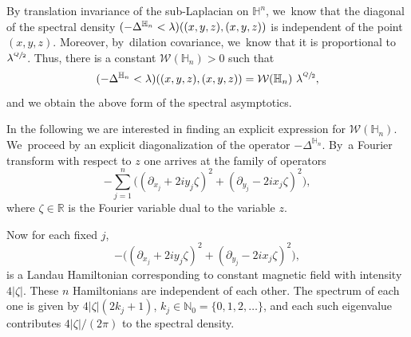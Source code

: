 \documentclass[11pt]{article}
\let\oldsfrac\sfrac
\renewcommand{\sfrac}[2]{{\oldsfrac{#1}{#2}}}
\theoremstyle{definition}
\newcommand{\1}{\mathbbm{1}}
\newcommand{\N}{\mathbb{N}}
\newcommand{\R}{\mathbb{R}}
\numberwithin{equation}{section}
\begin{document}
By translation invariance of the sub-Laplacian on $\mathbb H^n$, we~know that the diagonal of the spectral density $\1(-\Delta^{\mathbb H_n} <\lambda)((x,y,z),(x,y,z))$ is independent of the point $(x,y,z)$. Moreover, by~dilation covariance, we~know that it is proportional to $\lambda^{\sfrac{Q}{2}}$. Thus, there is a constant $\mathcal W(\mathbb H_n)>0$ such that
\begin{equation}\label{w2}
\1(-\Delta^{\mathbb H_n} <\lambda)((x,y,z),(x,y,z)) = \mathcal W(\mathbb H_n)\ \lambda^{\sfrac Q2},
\end{equation}
and we obtain the above form of the spectral asymptotics.

In the following we are interested in finding an explicit expression for $\mathcal W(\mathbb H_n)$. We~proceed by an explicit diagonalization of the operator $-\Delta^{\mathbb H_n}$. By~a Fourier transform with respect to $z$ one arrives at the family of operators
\[
- \sum_{j=1}^n \bigl((\partial_{x_j} + 2iy_j \zeta)^2 + (\partial_{y_j} - 2i x_j \zeta)^2 \bigr),
\]
where $\zeta\in\R$ is the Fourier variable dual to the variable $z$.

Now for each fixed $j$,
\[
- \bigl((\partial_{x_j} + 2i y_j \zeta)^2 + (\partial_{y_j} - 2ix_j \zeta)^2 \bigr),
\]
is a Landau Hamiltonian corresponding to constant magnetic field with intensity $4|\zeta|$. These $n$ Hamiltonians are independent of each other. The spectrum of each one is given by $4|\zeta|(2k_j +1)$, $k_j\in\N_0 =\{0,1,2,\ldots\}$, and each such eigenvalue contributes $4|\zeta|/(2\pi)$ to the spectral density.
\end{document}
